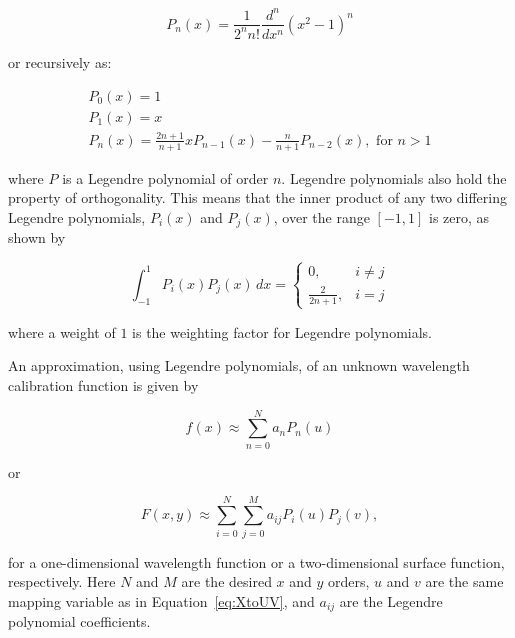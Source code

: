 \begin{equation}
    P_{n}(x) = \frac{1}{2^{n} n!} \frac{d^{n}}{d x^{n}} (x^{2} - 1)^{n}
    \label{eq:legpolyexplicit}
\end{equation}

\noindent or recursively as:

\begin{equation}
    \begin{gathered}
        P_{0}(x) = 1 \\
        P_{1}(x) = x \\
        P_{n}(x) = \frac{2 n + 1}{n + 1} x P_{n - 1}(x) - \frac{n}{n + 1} P_{n - 2}(x), \text{ for } n > 1
    \end{gathered}
    \label{eq:legpoly}
\end{equation}

\noindent where $P$ is a Legendre polynomial of order $n$. Legendre polynomials also hold the property of orthogonality. This means that the inner product of any two differing Legendre polynomials, $P_{i}(x)$ and $P_{j}(x)$, over the range $[-1, 1]$ is zero, as shown by

\begin{equation}
    \int_{-1}^{1} P_{i}(x) P_{j}(x) \,dx =
    \begin{cases}
        0,                 & i \neq j \\
        \frac{2}{2 n + 1}, & i = j
    \end{cases}
    \label{eq:legorth}
\end{equation}

\noindent where a weight of $1$ is the weighting factor for Legendre polynomials.
\prgph

An approximation, using Legendre polynomials, of an unknown wavelength calibration function is given by

\begin{equation}
    f(x) \approx \sum_{n = 0}^{N} a_{n} P_{n}(u)
    \label{eq:legendre}
\end{equation}

\noindent or

\begin{equation}
    F(x, y) \approx \sum_{i = 0}^{N} \sum_{j = 0}^{M} a_{ij} P_{i}(u) P_{j}(v),
    \label{eq:Legendre2D}
\end{equation}

\noindent for a one-dimensional wavelength function or a two-dimensional surface function, respectively. Here $N$ and $M$ are the desired $x$ and $y$ orders, $u$ and $v$ are the same mapping variable as in Equation~\ref{eq:XtoUV}, and $a_{ij}$ are the Legendre polynomial coefficients.
\prgph

